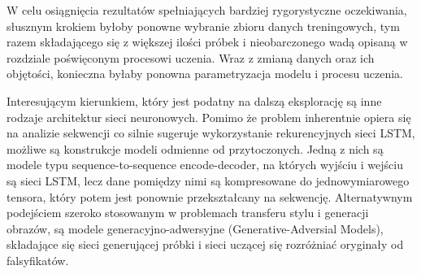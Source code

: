 {    W celu osiągnięcia rezultatów spełniających bardziej rygorystyczne oczekiwania, słusznym krokiem byłoby
    ponowne wybranie zbioru danych treningowych, tym razem składającego się z większej ilości próbek i nieobarczonego
    wadą opisaną w rozdziale poświęconym procesowi uczenia. 
    Wraz z zmianą danych oraz ich objętości, konieczna byłaby ponowna parametryzacja modelu i procesu uczenia.

    Interesującym kierunkiem, który jest podatny na dalszą eksplorację są inne rodzaje architektur sieci neuronowych.
    Pomimo że problem inherentnie opiera się na analizie sekwencji co silnie sugeruje wykorzystanie rekurencyjnych 
    sieci LSTM, możliwe są konstrukcje modeli odmienne od przytoczonych. Jedną z nich są modele typu 
    sequence-to-sequence encode-decoder, na których wyjściu i wejściu są sieci LSTM, lecz dane pomiędzy nimi są
    kompresowane do jednowymiarowego tensora, który potem jest ponownie przekształcany na sekwencję. 
    Alternatywnym podejściem szeroko stosowanym w problemach transferu stylu i generacji obrazów, 
    są modele generacyjno-adwersyjne (Generative-Adversial Models), składające się sieci generującej 
    próbki i sieci uczącej się rozróżniać oryginały od falsyfikatów.
}
